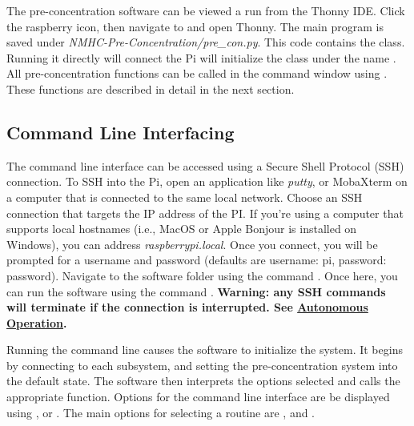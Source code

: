 The pre-concentration software can be viewed a run from the Thonny IDE. Click the raspberry icon, then navigate to  and open Thonny. The main program is saved under \emph{NMHC-Pre-Concentration/pre\_con.py}. 
This code contains the  class. Running it directly will connect the Pi will initialize the  class under the name . All pre-concentration functions can be called in the command window using . These functions are described in detail in the next section.

\subsection{Command Line Interfacing}
The command line interface can be accessed using a Secure Shell Protocol (SSH) connection. To SSH into the Pi, open an application like \emph{putty}, or MobaXterm on a computer that is connected to the same local network. Choose an SSH connection that targets the IP address of the PI. If you're using a computer that supports local hostnames (i.e., MacOS or Apple Bonjour is installed on Windows), you can address \emph{raspberrypi.local}. %
Once you connect, you will be prompted for a username and password (defaults are username: pi, password: password). 
Navigate to the software folder using the command . 
Once here, you can run the software using the command . \textbf{Warning: any SSH commands will terminate if the connection is interrupted. See \hyperref[auto operation]{Autonomous Operation}.} %

Running the command line causes the software to initialize the system. It begins by connecting to each subsystem, and setting the pre-concentration system into the default  state. The software then interprets the options selected and calls the appropriate function. Options for the command line interface are be displayed using , or . The main options for selecting a routine are , and .

